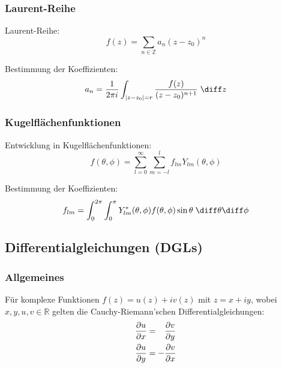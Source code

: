 \documentclass[11pt]{article}
\numberwithin{equation}{section}
\begin{document}
      \subsubsection{Laurent-Reihe}
        Laurent-Reihe:
        \begin{equation}
          f(z)=\sum_{n\in\mathbb{Z}} a_n(z-z_0)^n
        \end{equation}

        Bestimmung der Koeffizienten:
        \begin{equation}
          a_n = \frac{1}{2 \pi i}\int_{\left| z-z_0 \right| = r} \frac{f(z)}{(z-z_0)^{n+1}}\;\diff z
        \end{equation}

      \subsubsection{Kugelflächenfunktionen}
        Entwicklung in Kugelflächenfunktionen:
        \begin{equation}
          f(\theta, \phi) = \sum_{l=0}^{\infty} \sum_{m=-l}^{l} f_{lm} Y_{lm}(\theta,\phi)
        \end{equation}

        Bestimmung der Koeffizienten:
        \begin{equation}
          f_{lm} = \int_0^{2\pi} \int_0^\pi Y_{lm}^{*}(\theta,\phi) f(\theta,\phi) \sin\theta\;\diff\theta\diff\phi
        \end{equation}

    \subsection{Differentialgleichungen (DGLs)}
      \subsubsection{Allgemeines}
        Für komplexe Funktionen $f(z)=u(z)+iv(z)$ mit $z=x+iy$, wobei $x,y,u,v\in\mathbb{R}$ gelten die Cauchy-Riemann'schen Differentialgleichungen:
        \begin{equation}
          \begin{aligned}
            \frac{\partial u}{\partial x} &= \phantom{-}\frac{\partial v}{\partial y} \\
            \frac{\partial u}{\partial y} &= -\frac{\partial v}{\partial x} \\
          \end{aligned}
        \end{equation}
\end{document}
